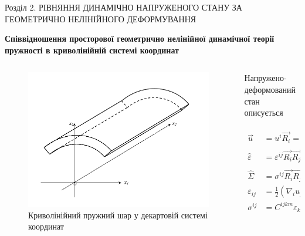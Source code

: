 \documentclass[8pt]{beamer}
\numberwithin{figure}{section}
\numberwithin{equation}{section}
\numberwithin{table}{section}
\begin{document}
\begin{frame}{Розділ 2. РІВНЯННЯ ДИНАМІЧНО НАПРУЖЕНОГО СТАНУ ЗА ГЕОМЕТРИЧНО НЕЛІНІЙНОГО ДЕФОРМУВАННЯ}

\textbf{Співвідношення просторової геометрично нелінійної динамічної теорії пружності в криволінійній системі координат
}

\begin{columns}
	\begin{column}{0.35\linewidth}
		\begin{figure}
			\includegraphics[scale=0.15]{pic/layer.png}
			\caption{Криволінійний пружний шар у декартовій системі координат}
			\label{fig:21}
		\end{figure}
	\end{column}
	\begin{column}{0.65\textwidth}
    	\begin{center}
	    	Напружено-деформований стан описується
    	\end{center}
\begin{align}
\vec{u} &= u^i \vec{R_i}=u_i \vec{R^i},\\
\hat{\varepsilon} &= \varepsilon^{ij} \vec{R_i}\vec{R_j}=\varepsilon_{ij} \vec{R^i}\vec{R^j},\\
\hat{\Sigma} &= \sigma^{ij} \vec{R_i}\vec{R_j}=\sigma_{ij} \vec{R^i}\vec{R^j},\\
\varepsilon_{ij} &= \frac{1}{2} \left( \nabla_i u_j + \nabla_j u_i + \nabla_i u^j \nabla_j u_k \right),\\
\sigma^{ij} &= C^{ijkm}\varepsilon_{km}.
\end{align}
	\end{column}
\end{columns}


\end{frame}
\end{document}
